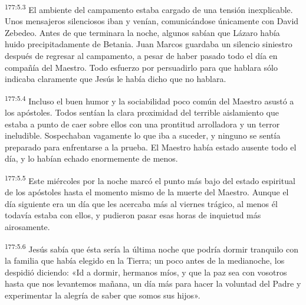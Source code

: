 \par 
\textsuperscript{177:5.3} El ambiente del campamento estaba cargado de una tensión inexplicable. Unos mensajeros silenciosos iban y venían, comunicándose únicamente con David Zebedeo. Antes de que terminara la noche, algunos sabían que Lázaro había huido precipitadamente de Betania. Juan Marcos guardaba un silencio siniestro después de regresar al campamento, a pesar de haber pasado todo el día en compañía del Maestro. Todo esfuerzo por persuadirlo para que hablara sólo indicaba claramente que Jesús le había dicho que no hablara.

\par 
\textsuperscript{177:5.4} Incluso el buen humor y la sociabilidad poco común del Maestro asustó a los apóstoles. Todos sentían la clara proximidad del terrible aislamiento que estaba a punto de caer sobre ellos con una prontitud arrolladora y un terror ineludible. Sospechaban vagamente lo que iba a suceder, y ninguno se sentía preparado para enfrentarse a la prueba. El Maestro había estado ausente todo el día, y lo habían echado enormemente de menos.

\par 
\textsuperscript{177:5.5} Este miércoles por la noche marcó el punto más bajo del estado espiritual de los apóstoles hasta el momento mismo de la muerte del Maestro. Aunque el día siguiente era un día que les acercaba más al viernes trágico, al menos él todavía estaba con ellos, y pudieron pasar esas horas de inquietud más airosamente.

\par 
\textsuperscript{177:5.6} Jesús sabía que ésta sería la última noche que podría dormir tranquilo con la familia que había elegido en la Tierra; un poco antes de la medianoche, los despidió diciendo: «Id a dormir, hermanos míos, y que la paz sea con vosotros hasta que nos levantemos mañana, un día más para hacer la voluntad del Padre y experimentar la alegría de saber que somos sus hijos».